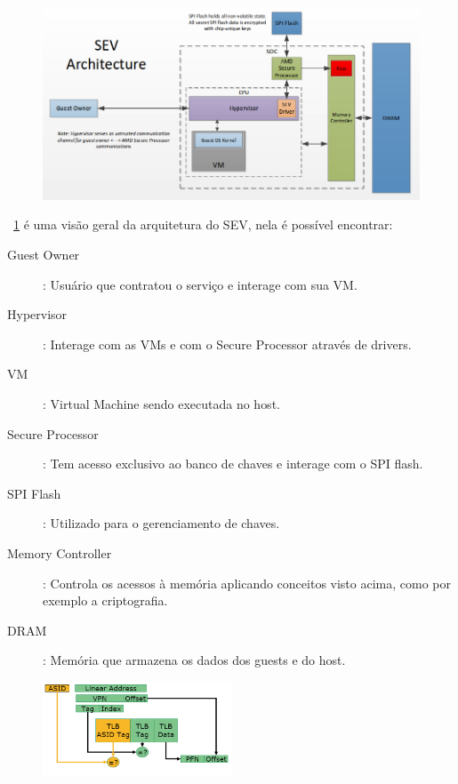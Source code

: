 \documentclass{report}
\begin{document}
\begin{figure}[h]
    \centering
    \includegraphics[width=1\textwidth]{img/sev-architecture}
    \label{sev-architecture}
\end{figure}

~\ref{sev-architecture} é uma visão geral da arquitetura do SEV, nela é possível encontrar:

\begin{description}
    \item[Guest Owner]: Usuário que contratou o serviço e interage com sua VM.
    \item[Hypervisor]: Interage com as VMs e com o Secure Processor através de
    drivers.
    \item[VM]: Virtual Machine sendo executada no host.
    \item[Secure Processor]: Tem acesso exclusivo ao banco de chaves e interage
    com o SPI flash.
    \item[SPI Flash]: Utilizado para o gerenciamento de chaves.
    \item[Memory Controller]: Controla os acessos à memória aplicando
    conceitos visto acima, como por exemplo a criptografia.
    \item[DRAM]: Memória que armazena os dados dos guests e do host.
\end{description}

\begin{figure}[h]
    \centering
    \includegraphics[width=0.5\textwidth]{img/asid}
    \label{asid}
\end{figure}
\end{document}
